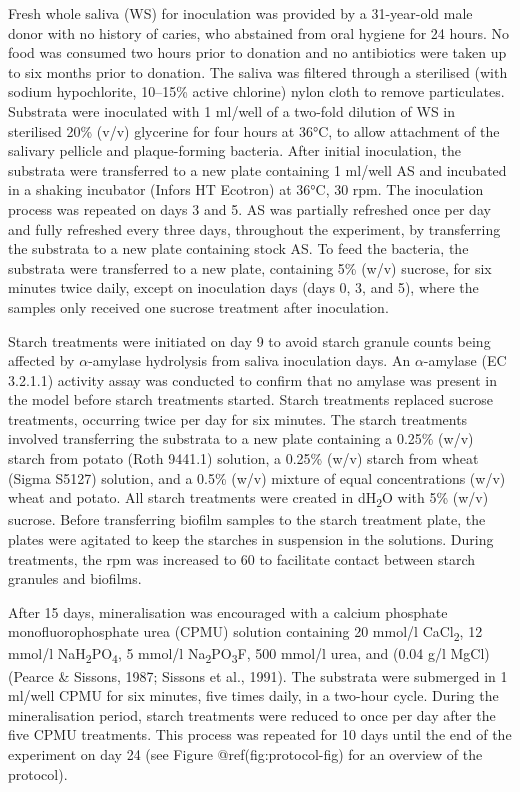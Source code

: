 \documentclass[
  letterpaper,
]{book}
\begin{document}
Fresh whole saliva (WS) for inoculation was provided by a 31-year-old
male donor with no history of caries, who abstained from oral hygiene
for 24 hours. No food was consumed two hours prior to donation and no
antibiotics were taken up to six months prior to donation. The saliva
was filtered through a sterilised (with sodium hypochlorite, 10--15\%
active chlorine) nylon cloth to remove particulates. Substrata were
inoculated with 1 ml/well of a two-fold dilution of WS in sterilised
20\% (v/v) glycerine for four hours at 36°C, to allow attachment of the
salivary pellicle and plaque-forming bacteria. After initial
inoculation, the substrata were transferred to a new plate containing 1
ml/well AS and incubated in a shaking incubator (Infors HT Ecotron) at
36°C, 30 rpm. The inoculation process was repeated on days 3 and 5. AS
was partially refreshed once per day and fully refreshed every three
days, throughout the experiment, by transferring the substrata to a new
plate containing stock AS. To feed the bacteria, the substrata were
transferred to a new plate, containing 5\% (w/v) sucrose, for six
minutes twice daily, except on inoculation days (days 0, 3, and 5),
where the samples only received one sucrose treatment after inoculation.

Starch treatments were initiated on day 9 to avoid starch granule counts
being affected by \(\alpha\)-amylase hydrolysis from saliva inoculation
days. An \(\alpha\)-amylase (EC 3.2.1.1) activity assay was conducted to
confirm that no amylase was present in the model before starch
treatments started. Starch treatments replaced sucrose treatments,
occurring twice per day for six minutes. The starch treatments involved
transferring the substrata to a new plate containing a 0.25\% (w/v)
starch from potato (Roth 9441.1) solution, a 0.25\% (w/v) starch from
wheat (Sigma S5127) solution, and a 0.5\% (w/v) mixture of equal
concentrations (w/v) wheat and potato. All starch treatments were
created in dH\textsubscript{2}O with 5\% (w/v) sucrose. Before
transferring biofilm samples to the starch treatment plate, the plates
were agitated to keep the starches in suspension in the solutions.
During treatments, the rpm was increased to 60 to facilitate contact
between starch granules and biofilms.

After 15 days, mineralisation was encouraged with a calcium phosphate
monofluorophosphate urea (CPMU) solution containing 20 mmol/l
CaCl\textsubscript{2}, 12 mmol/l
NaH\textsubscript{2}PO\textsubscript{4}, 5 mmol/l
Na\textsubscript{2}PO\textsubscript{3}F, 500 mmol/l urea, and (0.04 g/l
MgCl) (Pearce \& Sissons, 1987; Sissons et al., 1991). The substrata
were submerged in 1 ml/well CPMU for six minutes, five times daily, in a
two-hour cycle. During the mineralisation period, starch treatments were
reduced to once per day after the five CPMU treatments. This process was
repeated for 10 days until the end of the experiment on day 24 (see
Figure @ref(fig:protocol-fig) for an overview of the protocol).
\end{document}
